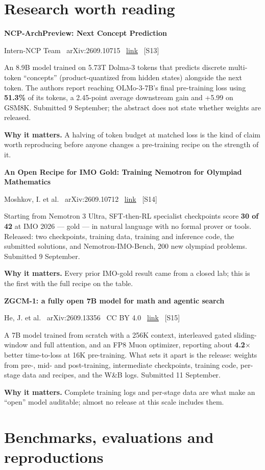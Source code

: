\documentclass[11pt,a4paper]{article}
\newcommand{\entry}[4]{%
  \par\vspace{0.7em}%
  \Needspace*{5\baselineskip}%
  {\sffamily\bfseries\color{brandink}#1}\par
  {\footnotesize\color{brandgrey}#2 \textbullet\ \href{#3}{link} \textbullet\ \srcref{#4}}\par
  \vspace{0.15em}}
\newcommand{\why}[1]{\par{\small\textbf{Why it matters.} #1}\par}
\newcommand{\srcref}[1]{\textcolor{brandaccent}{[S#1]}}
\begin{document}
\section{Research worth reading}

\entry{NCP-ArchPreview: Next Concept Prediction}{Intern-NCP Team \textbullet\ arXiv:2609.10715}{https://arxiv.org/abs/2609.10715}{13}
An 8.9B model trained on 5.73T Dolma-3 tokens that predicts discrete multi-token
``concepts'' (product-quantized from hidden states) alongside the next token. The authors
report reaching OLMo-3-7B's final pre-training loss using \textbf{51.3\%} of its tokens, a
2.45-point average downstream gain and +5.99 on GSM8K. Submitted 9 September; the abstract
does not state whether weights are released.
\why{A halving of token budget at matched loss is the kind of claim worth reproducing
before anyone changes a pre-training recipe on the strength of it.}

\entry{An Open Recipe for IMO Gold: Training Nemotron for Olympiad Mathematics}{Moshkov, I. et al. \textbullet\ arXiv:2609.10712}{https://arxiv.org/abs/2609.10712}{14}
Starting from Nemotron 3 Ultra, SFT-then-RL specialist checkpoints score \textbf{30 of 42}
at IMO 2026 --- gold --- in natural language with no formal prover or tools. Released: two
checkpoints, training data, training and inference code, the submitted solutions, and
Nemotron-IMO-Bench, 200 new olympiad problems. Submitted 9 September.
\why{Every prior IMO-gold result came from a closed lab; this is the first with the full
recipe on the table.}

\entry{ZGCM-1: a fully open 7B model for math and agentic search}{He, J. et al. \textbullet\ arXiv:2609.13356 \textbullet\ CC BY 4.0}{https://arxiv.org/abs/2609.13356}{15}
A 7B model trained from scratch with a 256K context, interleaved gated sliding-window and
full attention, and an FP8 Muon optimizer, reporting about \textbf{4.2$\times$} better
time-to-loss at 16K pre-training. What sets it apart is the release: weights from
pre-, mid- and post-training, intermediate checkpoints, training code, per-stage data and
recipes, and the W\&B logs. Submitted 11 September.
\why{Complete training logs and per-stage data are what make an ``open'' model
auditable; almost no release at this scale includes them.}


\section{Benchmarks, evaluations and reproductions}
\end{document}
